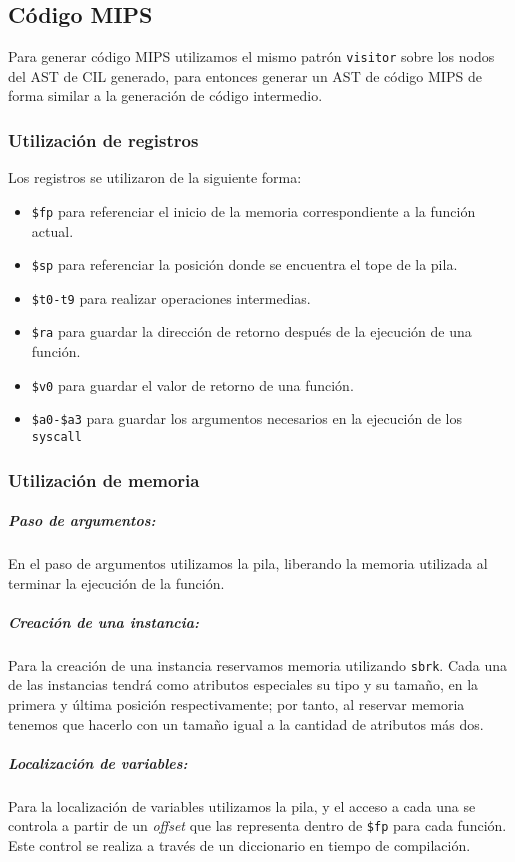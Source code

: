 \documentclass[a4paper,10pt,twocolumn]{article}
\begin{document}
\subsection{Código MIPS}

Para generar código MIPS utilizamos el mismo patrón \lstinline|visitor| sobre los nodos del AST de CIL generado, para entonces generar un AST de código MIPS de forma similar a la generación de código intermedio. 

\subsubsection{Utilización de registros}
Los registros se utilizaron de la siguiente forma:
\begin{itemize}
	\item \lstinline|$fp| para referenciar el inicio de la memoria correspondiente a la función actual.
	\item \lstinline|$sp| para referenciar la posición donde se encuentra el tope de la pila. 
	\item \lstinline|$t0-t9| para realizar operaciones intermedias. 
	\item \lstinline|$ra| para guardar la dirección de retorno después de la ejecución de una función. 
	\item \lstinline|$v0| para guardar el valor de retorno de una función. 
	\item \lstinline|$a0-$a3| para guardar los argumentos necesarios en la ejecución de los \lstinline|syscall|
\end{itemize}

\subsubsection{Utilización de memoria}

\subparagraph{Paso de argumentos:}
	 En el paso de argumentos utilizamos la pila, liberando la memoria utilizada al terminar la ejecución de la función. 
\subparagraph{Creación de una instancia:}
	Para la creación de una instancia reservamos memoria utilizando \lstinline|sbrk|. Cada una de las instancias tendrá como atributos especiales su tipo y su tamaño, en la primera y última posición respectivamente; por tanto, al reservar memoria tenemos que hacerlo con un tamaño igual a la cantidad de atributos más dos.

\subparagraph{Localización de variables:}
	Para la localización de variables utilizamos la pila, y el acceso a cada una se controla a partir de un \textit{offset} que las representa dentro de \lstinline|$fp| para cada función. Este control se realiza a través de un diccionario en tiempo de compilación. 
	
\end{document}
